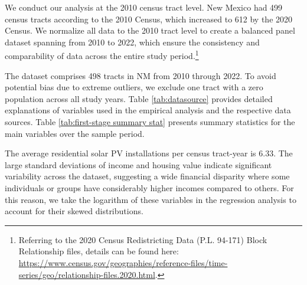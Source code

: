 \documentclass[12pt,twoside,letterpaper]{article}
\begin{document}
We conduct our analysis at the 2010 census tract level. New Mexico had 499 census tracts according to the 2010 Census, which increased to 612 by the 2020 Census. We normalize all data to the 2010 tract level to create a balanced panel dataset spanning from 2010 to 2022, which ensure the consistency and comparability of data across the entire study period.\footnote{Referring to the 2020 Census Redistricting Data (P.L. 94-171) Block Relationship files, details can be found here: \url{https://www.census.gov/geographies/reference-files/time-series/geo/relationship-files.2020.html}.} 

The dataset comprises 498 tracts in NM from 2010 through 2022. To avoid potential bias due to extreme outliers, we exclude one tract with a zero population across all study years. Table \ref{tab:datasource} provides detailed explanations of variables used in the empirical analysis and the respective data sources. Table \ref{tab:first-stage summary stat} presents summary statistics for the main variables over the sample period. 

The average residential solar PV installations per census tract-year is 6.33. The large standard deviations of income and housing value indicate significant variability across the dataset, suggesting a wide financial disparity where some individuals or groups have considerably higher incomes compared to others. For this reason, we take the logarithm of these variables in the regression analysis to account for their skewed distributions.
\end{document}

